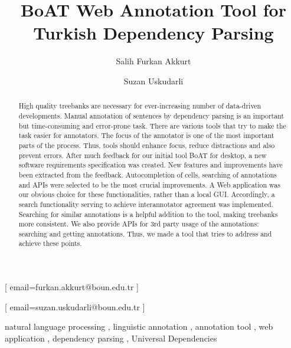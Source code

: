\documentclass[
]{ceurart}
\begin{document}


\title{BoAT Web Annotation Tool for Turkish Dependency Parsing}

\author[]{Salih Furkan Akkurt}[%
email=furkan.akkurt@boun.edu.tr
]
\author[]{Suzan Uskudarli}[%
email=suzan.uskudarli@boun.edu.tr
]

\address[]{ Department of Computer Engineering, Bogazici University, Bebek, 34342, İstanbul, Turkey }

\begin{abstract}
High quality treebanks are necessary for ever-increasing number of data-driven developments.
Manual annotation of sentences by dependency parsing is an important but time-consuming and error-prone task.
There are various tools that try to make the task easier for annotators.
The focus of the annotator is one of the most important parts of the process.
Thus, tools should enhance focus, reduce distractions and also prevent errors.
After much feedback for our initial tool BoAT for desktop, a new software requirements specification was created.
New features and improvements have been extracted from the feedback.
Autocompletion of cells, searching of annotations and APIs were selected to be the most crucial improvements.
A Web application was our obvious choice for these functionalities, rather than a local GUI.
Accordingly, a search functionality serving to achieve interannotator agreement was implemented.
Searching for similar annotations is a helpful addition to the tool, making treebanks more consistent.
We also provide APIs for 3rd party usage of the annotations: searching and getting annotations.
Thus, we made a tool that tries to address and achieve these points.
\end{abstract}

\begin{keywords}
natural language processing \sep
linguistic annotation \sep
annotation tool \sep
web application \sep
dependency parsing \sep
Universal Dependencies
\end{keywords}
\end{document}
